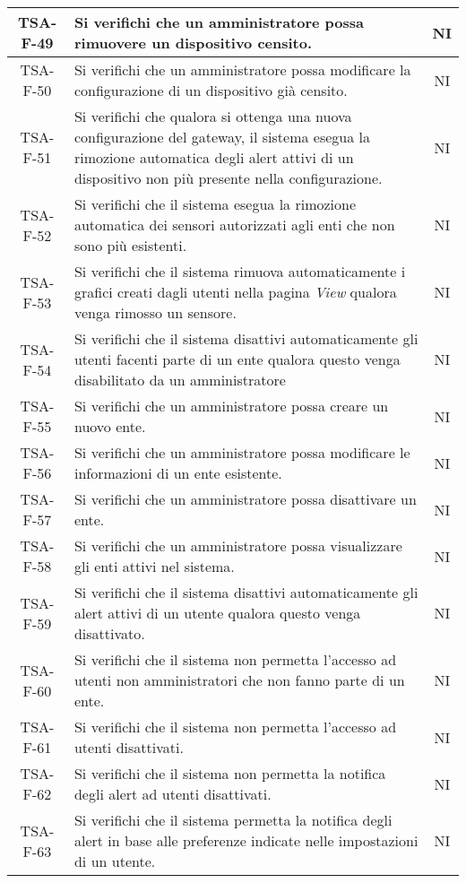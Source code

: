 \begin{center}
\begin{longtable}{|c|p{10cm}|c|}
			 \hline
			 TSA-F-49 & Si verifichi che un amministratore possa rimuovere un dispositivo censito. & NI \\
			 \hline
			 TSA-F-50 & Si verifichi che un amministratore possa modificare la configurazione di un dispositivo già censito. & NI \\
			 \hline
			 TSA-F-51 & Si verifichi che qualora si ottenga una nuova configurazione del gateway, il sistema esegua la rimozione automatica degli alert attivi di un dispositivo non più presente nella configurazione. & NI \\
			 \hline
			 TSA-F-52 & Si verifichi che il sistema esegua la rimozione automatica dei sensori autorizzati agli enti che non sono più esistenti. & NI \\
			 \hline
			 TSA-F-53 & Si verifichi che il sistema rimuova automaticamente i grafici creati dagli utenti nella pagina \textit{View} qualora venga rimosso un sensore. & NI \\
			 \hline
			 TSA-F-54 & Si verifichi che il sistema disattivi automaticamente gli utenti facenti parte di un ente qualora questo venga disabilitato da un amministratore & NI \\
			 \hline
			 TSA-F-55 & Si verifichi che un amministratore possa creare un nuovo ente. & NI \\
			 \hline
			 TSA-F-56 & Si verifichi che un amministratore possa modificare le informazioni di un ente esistente. & NI \\
			 \hline
			 TSA-F-57 & Si verifichi che un amministratore possa disattivare un ente. & NI \\
			 \hline
			 TSA-F-58 & Si verifichi che un amministratore possa visualizzare gli enti attivi nel sistema. & NI \\
			 \hline
			 TSA-F-59 & Si verifichi che il sistema disattivi automaticamente gli alert attivi di un utente qualora questo venga disattivato. & NI \\
			 \hline
			 TSA-F-60 & Si verifichi che il sistema non permetta l'accesso ad utenti non amministratori che non fanno parte di un ente. & NI \\
			 \hline
			 TSA-F-61 & Si verifichi che il sistema non permetta l'accesso ad utenti disattivati. & NI \\
			 \hline
			 TSA-F-62 & Si verifichi che il sistema non permetta la notifica degli alert ad utenti disattivati. & NI \\
			 \hline
			 TSA-F-63 & Si verifichi che il sistema permetta la notifica degli alert in base alle preferenze indicate nelle impostazioni di un utente. & NI \\

\end{longtable}
\end{center}
